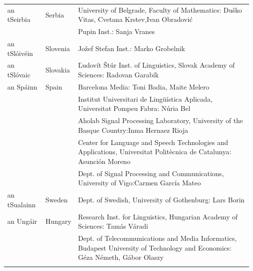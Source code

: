 \begin{longtable}{@{}llp{113mm}@{}}
  an tSeirbia & \textcolor{grey1}{Serbia} & University of Belgrade, Faculty of Mathematics: Duško Vitas, Cvetana Krstev,\newline Ivan Obradović \\ \addlinespace
  & & Pupin Inst.: Sanja Vranes \\ \addlinespace
    
  an tSlóivéin & \textcolor{grey1}{Slovenia} & Jožef Stefan Inst.: Marko Grobelnik \\ \addlinespace
   
  an tSlóvaic & \textcolor{grey1}{Slovakia} & Ľudovít Štúr Inst. of Linguistics, Slovak Academy of Sciences: Radovan Garabík \\ \addlinespace
   
  an Spáinn & \textcolor{grey1}{Spain} & Barcelona Media: Toni Badia, Maite Melero \\ \addlinespace 
  & & Institut Universitari de Lingüística Aplicada, Universitat Pompeu Fabra: Núria Bel \\ \addlinespace 
  & & Aholab Signal Processing Laboratory, University of the Basque Country:\newline Inma Hernaez Rioja \\ \addlinespace 
  & & Center for Language and Speech Technologies and Applications, Universitat Politècnica de Catalunya:  Asunción Moreno \\ \addlinespace 
  & & Dept. of Signal Processing and Communications, University of Vigo:\newline Carmen García Mateo \\ \addlinespace
  
  an tSualainn & \textcolor{grey1}{Sweden} & Dept. of Swedish, University of Gothenburg: Lars Borin \\ \addlinespace
   
  an Ungáir & \textcolor{grey1}{Hungary} & Research Inst. for Linguistics, Hungarian Academy of Sciences: Tamás Váradi\\  \addlinespace
  & & Dept. of Telecommunications and Media Informatics, Budapest University of Technology and Economics: Géza Németh, Gábor Olaszy\\ \addlinespace
  
\end{longtable}
\normalsize

\renewcommand*{\figureformat}{}
\renewcommand*{\captionformat}{}

